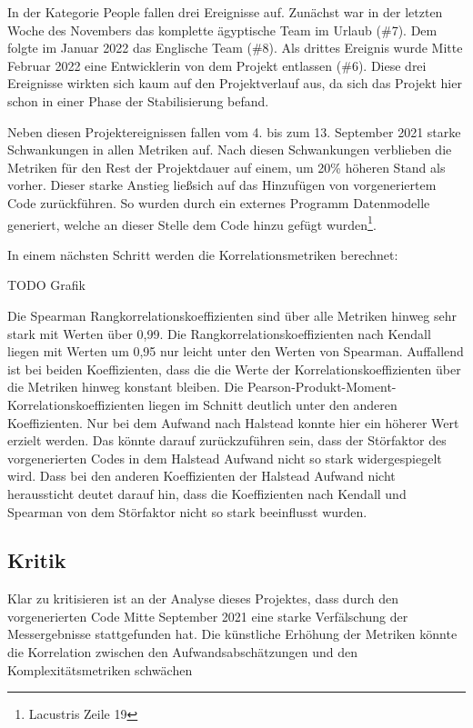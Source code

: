 In der Kategorie People fallen drei Ereignisse auf. Zunächst war in der
letzten Woche des Novembers das komplette ägyptische Team im Urlaub (\#7). Dem folgte im Januar 2022 das Englische Team
(\#8). Als drittes Ereignis wurde Mitte Februar
2022 eine Entwicklerin von dem Projekt entlassen (\#6). Diese drei Ereignisse wirkten sich kaum auf
den Projektverlauf aus, da sich das Projekt hier schon in einer Phase
der Stabilisierung befand.

Neben diesen Projektereignissen fallen vom 4. bis zum 13. September 2021
starke Schwankungen in allen Metriken auf. Nach diesen Schwankungen
verblieben die Metriken für den Rest der Projektdauer auf einem, um 20\%
höheren Stand als vorher. Dieser starke Anstieg lie\ss  sich auf das
Hinzufügen von vorgeneriertem Code zurückführen. So wurden durch ein
externes Programm Datenmodelle generiert, welche an dieser Stelle dem
Code hinzu gefügt wurden\footnote{Lacustris Zeile 19}.

In einem nächsten Schritt werden die Korrelationsmetriken berechnet:

TODO Grafik

Die Spearman Rangkorrelationskoeffizienten sind über alle Metriken
hinweg sehr stark mit Werten über 0,99. Die
Rangkorrelationskoeffizienten nach Kendall liegen mit Werten um 0,95 nur
leicht unter den Werten von Spearman. Auffallend ist bei beiden
Koeffizienten, dass die die Werte der Korrelationskoeffizienten über die
Metriken hinweg konstant bleiben. Die
Pearson-Produkt-Moment-Korrelationskoeffizienten liegen im Schnitt
deutlich unter den anderen Koeffizienten. Nur bei dem Aufwand nach
Halstead konnte hier ein höherer Wert erzielt werden. Das könnte darauf
zurückzuführen sein, dass der Störfaktor des vorgenerierten Codes in dem
Halstead Aufwand nicht so stark widergespiegelt wird. Dass bei den
anderen Koeffizienten der Halstead Aufwand nicht heraussticht deutet
darauf hin, dass die Koeffizienten nach Kendall und Spearman von dem
Störfaktor nicht so stark beeinflusst wurden.

\subsection{Kritik}\label{lm-kritik}

Klar zu kritisieren ist an der Analyse dieses Projektes, dass durch den
vorgenerierten Code Mitte September 2021 eine starke Verfälschung der
Messergebnisse stattgefunden hat. Die künstliche Erhöhung der Metriken
könnte die Korrelation zwischen den Aufwandsabschätzungen und den
Komplexitätsmetriken schwächen

